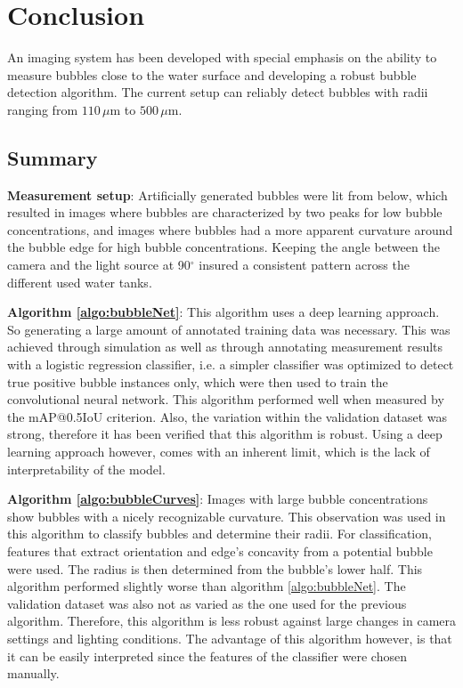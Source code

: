 \chapter{Conclusion}\label{discussion}
An imaging system has been developed with special emphasis on the ability to measure bubbles close to the water surface and developing a robust bubble detection algorithm. The current setup can reliably detect bubbles with radii ranging from $110$\,$\mu$m to $500$\,$\mu$m.

\section{Summary}
\textbf{Measurement setup}: Artificially generated bubbles were lit from below, which resulted in images where bubbles are characterized by two peaks for low bubble concentrations, and images where bubbles had a more apparent curvature around the bubble edge for high bubble concentrations. Keeping the angle between the camera and the light source at 90$^\circ$ insured a consistent pattern across the different used water tanks. 

\textbf{Algorithm \ref{algo:bubbleNet}}: This algorithm uses a deep learning approach. So generating a large amount of annotated training data was necessary. This was achieved through simulation as well as through annotating measurement results with a logistic regression classifier, i.e. a simpler classifier was optimized to detect true positive bubble instances only, which were then used to train the convolutional neural network. This algorithm performed well when measured by the mAP@0.5IoU criterion. Also, the variation within the validation dataset was strong, therefore it has been verified that this algorithm is robust. Using a deep learning approach however, comes with an inherent limit, which is the lack of interpretability of the model. 

\textbf{Algorithm \ref{algo:bubbleCurves}}: Images with large bubble concentrations show bubbles with a nicely recognizable curvature. This observation was used in this algorithm to classify bubbles and determine their radii. For classification, features that extract orientation and edge's concavity from a potential bubble were used. The radius is then determined from the bubble's lower half. This algorithm performed slightly worse than algorithm \ref{algo:bubbleNet}. 
The validation dataset was also not as varied as the one used for the previous algorithm. Therefore, this algorithm is less robust against large changes in camera settings and lighting conditions. The advantage of this algorithm however, is that it can be easily interpreted since the features of the classifier were chosen manually. 

